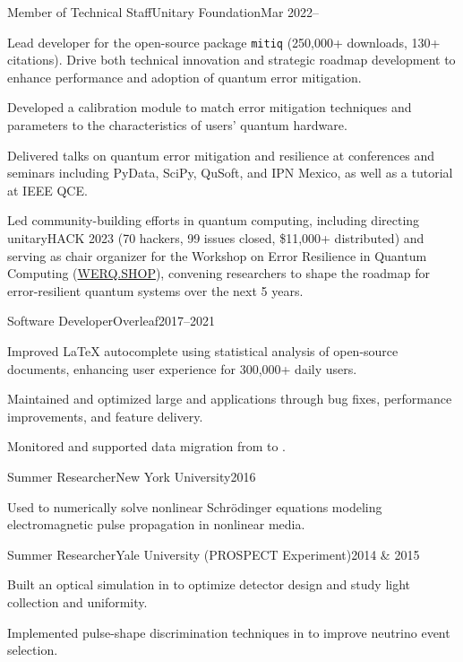 \documentclass{cultvoucher}
\begin{document}
\begin{entry}{Member of Technical Staff}{Unitary Foundation}{Mar 2022--}
	\item Lead developer for the open-source  package \texttt{mitiq} (250,000+ downloads, 130+ citations).
		Drive both technical innovation and strategic roadmap development to enhance performance and adoption of quantum error mitigation.
	\item Developed a calibration module to match error mitigation techniques and parameters to the characteristics of users' quantum hardware.
	\item Delivered talks on quantum error mitigation and resilience at conferences and seminars including PyData, SciPy, QuSoft, and IPN Mexico, as well as a tutorial at IEEE QCE.
	\item Led community-building efforts in quantum computing, including directing unitaryHACK 2023 (70 hackers, 99 issues closed, \$11,000+ distributed) and serving as chair organizer for the Workshop on Error Resilience in Quantum Computing (\href{https://werq.shop}{WERQ.SHOP}), convening researchers to shape the roadmap for error-resilient quantum systems over the next 5 years.
\end{entry}

\begin{entry}{Software Developer}{Overleaf}{2017--2021}
    \item Improved \LaTeX{} autocomplete using statistical analysis of open-source documents, enhancing user experience for 300,000+ daily users.
    \item Maintained and optimized large  and  applications through bug fixes, performance improvements, and feature delivery.
    \item Monitored and supported data migration from  to .
\end{entry}

\begin{entry}{Summer Researcher}{New York University}{2016}
	\item Used  to numerically solve nonlinear Schr\"{o}dinger equations modeling electromagnetic pulse propagation in nonlinear media.
\end{entry}

\begin{entry}{Summer Researcher}{Yale University (PROSPECT Experiment)}{2014 \& 2015}
    \item Built an optical simulation in  to optimize detector design and study light collection and uniformity.
    \item Implemented pulse-shape discrimination techniques in  to improve neutrino event selection.
\end{entry}
\end{document}
